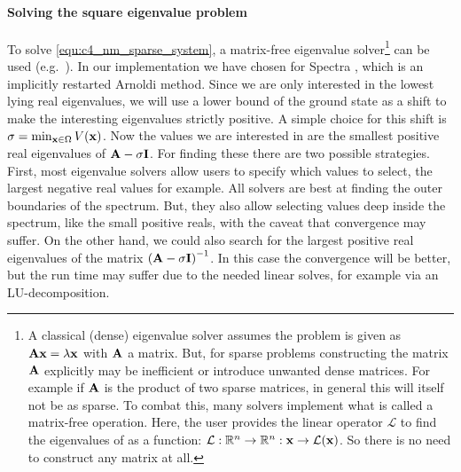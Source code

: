 
\paragraph{Solving the square eigenvalue problem}
To solve \eqref{equ:c4_nm_sparse_system}, a matrix-free eigenvalue solver\footnote{A classical (dense) eigenvalue solver assumes the problem is given as $\vb{A} \vb{x} = \lambda \vb{x}$ with $\vb{A}$ a matrix. But, for sparse problems constructing the matrix $\vb{A}$ explicitly may be inefficient or introduce unwanted dense matrices. For example if $\vb{A}$ is the product of two sparse matrices, in general this will itself not be as sparse. To combat this, many solvers implement what is called a matrix-free operation. Here, the user provides the linear operator $\mathcal{L}$ to find the eigenvalues of as a function: $\mathcal{L} : \mathbb{R}^n \to \mathbb{R}^n : \vb{x} \to \mathcal{L}(\vb{x})$. So there is no need to construct any matrix at all.} can be used (e.g.~\cite{lehoucq_arpack_1998,hernandez_slepc_2005,qiu_yixuan_2022}). In our implementation we have chosen for Spectra \cite{qiu_yixuan_2022}, which is an implicitly restarted Arnoldi method. Since we are only interested in the lowest lying real eigenvalues, we will use a lower bound of the ground state as a shift to make the interesting eigenvalues strictly positive. A simple choice for this shift is $\sigma = \min_{\vb{x} \in \Omega} V(\vb{x})$. Now the values we are interested in are the smallest positive real eigenvalues of $\vb{A} - \sigma \vb{I}$. For finding these there are two possible strategies. First, most eigenvalue solvers allow users to specify which values to select, the largest negative real values for example. All solvers are best at finding the outer boundaries of the spectrum. But, they also allow selecting values deep inside the spectrum, like the small positive reals, with the caveat that convergence may suffer. On the other hand, we could also search for the largest positive real eigenvalues of the matrix $\left(\vb{A} - \sigma \vb{I}\right)^{-1}$. In this case the convergence will be better, but the run time may suffer due to the needed linear solves, for example via an LU-decomposition.

